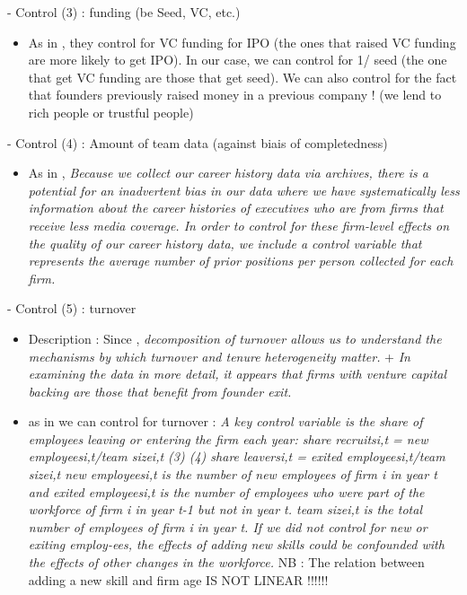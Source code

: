 \begin{itemize}
\begin{itemize}
- Control (3) : funding (be Seed, VC, etc.)
\begin{itemize}
  \item As in \citet{beckman2007early}, they control for VC funding for IPO (the ones that raised VC funding are more likely to get IPO). In our case, we can control for 1/ seed (the one that get VC funding are those that get seed). We can also control for the fact that founders previously raised money in a previous company ! (we lend to rich people or trustful people)
\end{itemize}

- Control (4) : Amount of team data (against biais of completedness)
\begin{itemize}
  \item As in \citet{beckman2007early}, \textit{Because we collect our career history data via archives, there is a potential for an inadvertent bias in our data where we have systematically less information about the career histories of executives who are from firms that receive less media coverage. In order to control for these firm-level effects on the quality of our career history data, we include a control variable that represents the average number of prior positions per person collected for each firm.}
\end{itemize}

- Control (5) : turnover
\begin{itemize}
  \item Description : Since \citep{beckman2007early}, \textit{decomposition of turnover allows us to understand the mechanisms by which turnover and tenure heterogeneity matter.} + \textit{In examining the data in more detail, it appears that firms with venture capital backing are those that benefit from founder exit.}
  \item as in \citet{grillitsch2020does} we can control for turnover : \textit{A key control variable is the share of employees leaving or entering the firm each year: share recruitsi,t = new employeesi,t/team sizei,t (3) (4) share leaversi,t = exited employeesi,t/team sizei,t new employeesi,t is the number of new employees of firm i in year t and exited employeesi,t is the number of employees who were part of the workforce of firm i in year t-1 but not in year t. team sizei,t is the total number of employees of firm i in year t. If we did not control for new or exiting employ-ees, the effects of adding new skills could be confounded with the effects of other changes in the workforce.} NB : The relation between adding a new skill and firm age IS NOT LINEAR !!!!!!
\end{itemize}


\end{itemize}
\end{itemize}
